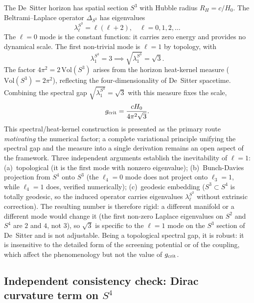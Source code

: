\documentclass[11pt,a4paper]{article}
\begin{document}
The De~Sitter horizon has spatial section $S^3$ with Hubble radius $R_H = c/H_0$.
The Beltrami--Laplace operator $\Delta_{S^3}$ has eigenvalues
\begin{equation}
  \lambda_\ell^{S^3} = \ell(\ell+2), \quad \ell = 0,1,2,\ldots
\end{equation}
The $\ell = 0$ mode is the constant function: it carries zero energy and provides no
dynamical scale. The first non-trivial mode is $\ell = 1$ by topology, with
\begin{equation}
  \lambda_1^{S^3} = 3 \implies \sqrt{\lambda_1^{S^3}} = \sqrt{3}.
\end{equation}
The factor $4\pi^2 = 2\,\text{Vol}(S^3)$ arises from the horizon heat-kernel measure
($\text{Vol}(S^3) = 2\pi^2$), reflecting the four-dimensionality of De~Sitter spacetime.
Combining the spectral gap $\sqrt{\lambda_1^{S^3}} = \sqrt{3}$ with this measure fixes
the scale,
\begin{equation}
  g_{\rm crit} = \frac{cH_0}{4\pi^2\sqrt{3}}.
\end{equation}
This spectral/heat-kernel construction is presented as the primary route \emph{motivating}
the numerical factor; a complete variational principle unifying the spectral gap and the
measure into a single derivation remains an open aspect of the framework.
Three independent arguments establish the inevitability of $\ell = 1$: (a)~topological
(it is the first mode with nonzero eigenvalue); (b)~Bunch-Davies projection from $S^4$
onto $S^3$ (the $\ell_4=0$ mode does not project onto $\ell_3=1$, while $\ell_4=1$
does, verified numerically); (c)~geodesic embedding ($S^3\subset S^4$ is totally
geodesic, so the induced operator carries eigenvalues $\lambda_\ell^{S^3}$ without
extrinsic correction).
The resulting number is therefore rigid: a different manifold or a different mode would
change it (the first non-zero Laplace eigenvalues on $S^2$ and $S^4$ are $2$ and $4$, not
$3$), so $\sqrt{3}$ is specific to the $\ell=1$ mode on the $S^3$ section of De~Sitter and
is not adjustable. Being a topological spectral gap, it is robust: it is insensitive to the
detailed form of the screening potential or of the coupling, which affect the phenomenology
but not the value of $g_{\rm crit}$.

\subsection{Independent consistency check: Dirac curvature term on \texorpdfstring{$S^4$}{S4}}
\label{subsec:DL}
\end{document}
